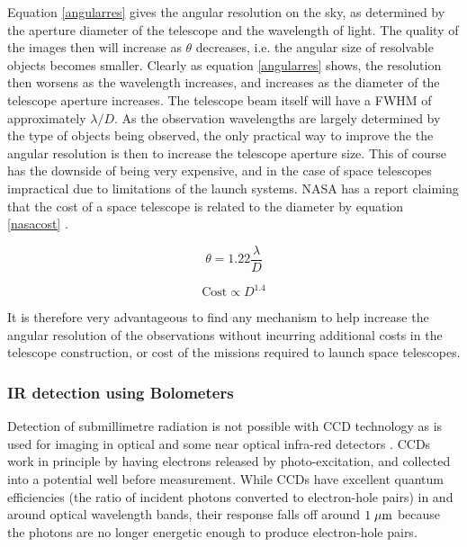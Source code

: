 Equation \ref{angularres} gives the angular resolution on the sky, as determined by the aperture diameter of the telescope and the wavelength of light. The quality of the images then will increase as $\theta$ decreases, i.e. the angular size of resolvable objects becomes smaller. Clearly as equation \ref{angularres} shows, the resolution then worsens as the wavelength increases, and increases as the diameter of the telescope aperture increases. The telescope beam itself will have a FWHM of approximately $\lambda/D$. As the observation wavelengths are largely determined by the type of objects being observed, the only practical way to improve the the angular resolution is then to increase the telescope aperture size. This of course has the downside of being very expensive, and in the case of space telescopes impractical due to limitations of the launch systems. NASA has a report claiming that the cost of a space telescope is related to the diameter by equation \ref{nasacost} \citep{stahl2011update}.

\begin{equation}
    \theta = 1.22 \frac{\lambda}D
    \label{angularres}
\end{equation}

\begin{equation}
    \text{Cost} \propto D^{1.4}
    \label{nasacost}
\end{equation}

It is therefore very advantageous to find any mechanism to help increase the angular resolution of the observations without incurring additional costs in the telescope construction, or cost of the missions required to launch space telescopes.

\subsubsection{IR detection using Bolometers}

Detection of submillimetre radiation is not possible with CCD technology as is used for imaging in optical and some near optical infra-red detectors \citep{janesick2001scientific}. CCDs work in principle by having electrons released by photo-excitation, and collected into a potential well before measurement. While CCDs have excellent quantum efficiencies (the ratio of incident photons converted to electron-hole pairs) in and around optical wavelength bands, their response falls off around $1\;\mathrm{\mu m}$ because the photons are no longer energetic enough to produce electron-hole pairs.

